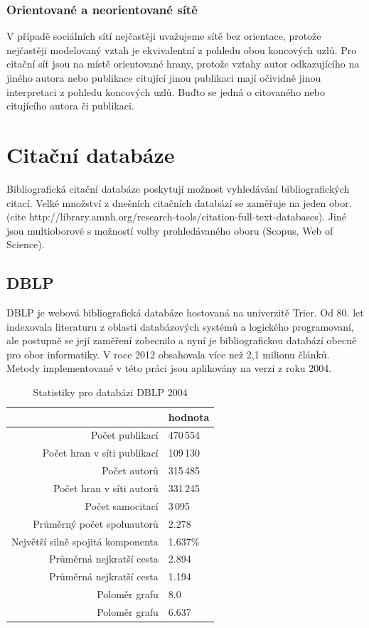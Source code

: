 \documentclass{bakalarka}
\begin{document}
\subsection{Orientované a neorientované sítě}
V případě sociálních sítí nejčastěji uvažujeme sítě bez orientace, protože
nejčastěji modelovaný vztah  je ekvivalentní z pohledu obou
koncových uzlů. Pro citační síť jsou na místě orientované hrany, protože vztahy
autor odkazujícího na jiného autora nebo publikace citující jinou publikaci
mají očividně jinou interpretaci z pohledu koncových uzlů. Buďto se jedná o
citovaného nebo citujícího autora či publikaci.


\chapter{Citační databáze}
Bibliografická citační databáze poskytují možnost vyhledávání bibliografických
citací. Velké množství z dnešních citačních databází se zaměřuje na jeden obor.
(cite http://library.amnh.org/research-tools/citation-full-text-databases).
Jiné jsou multioborové s možností volby prohledávaného oboru (Scopus, Web of
Science).

\section{DBLP}
DBLP \cite{DBLP} je webová bibliografická databáze hostovaná na univerzitě
Trier. Od 80.  let indexovala literaturu z oblasti databázových systémů a
logického programovaní, ale postupně se její zaměření zobecnilo a nyní je
bibliografickou databází obecně pro obor informatiky. 
V roce 2012 obsahovala více než 2,1 milionu článků. Metody implementované v
této práci jsou aplikovány na verzi z roku 2004. 

\begin{table}[!ht]
\centering
\caption{Statistiky pro databázi DBLP 2004}
\label{tab:dblpstat}
\begin{tabular}{r|l}
\toprule
& hodnota \\
\midrule
Počet publikací & 470\,554 \\
Počet hran v síti publikací & 109\,130 \\
Počet autorů & 315\,485 \\
Počet hran v síti autorů & 331\,245 \\
Počet samocitací & 3\,095 \\
Průměrný počet spoluautorů & 2.278 \\
Největší silně spojitá komponenta & 1.637\% \\
Průměrná nejkratší cesta\footnotemark[1] & 2.894 \\
Průměrná nejkratší cesta\footnotemark[2] & 1.194 \\
Poloměr grafu\footnotemark[1] & 8.0 \\
Poloměr grafu\footnotemark[2] & 6.637 \\
\bottomrule
\end{tabular}
\end{table}
\end{document}
